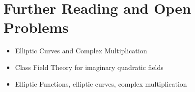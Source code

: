 \section{Further Reading and Open Problems}

\begin{itemize}
\item Elliptic Curves and Complex Multiplication \cite{Silverman:AEC,Silverman:Adv}
\item Class Field Theory for imaginary quadratic fields \cite{Cox}
\item Elliptic Functions, elliptic curves, complex multiplication \cite{Lang:elliptic}
\end{itemize}


